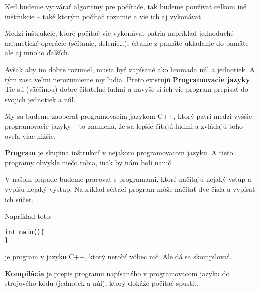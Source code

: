 \medskip

Keď budeme vytvárať algoritmy pre počítače, tak budeme používať celkom iné
inštrukcie -- také ktorým počítač rozumie a vie ich aj vykonávať.

Medzi inštrukcie, ktoré počítač vie vykonávať patria napríklad jednoduché
aritmetické operácie (sčítanie, delenie\dots), čítanie z pamäte ukladanie do
pamäte ale aj mnoho ďalších. 

Avšak aby im dobre rozumel, musia byť zapísané ako hromada núl a jednotiek. A
tým zasa veľmi nerozumieme my ľudia.  Preto existujú \textbf{Programovacie
jazyky}. Tie sú (väčšinou) dobre čitateľné ľudmi a navyše si ich vie program
prepísať do svojich jednotiek a núl.

My sa budeme zaoberať programovacím jazykom C++, ktorý patrí medzi vyššie
programovacie jazyky -- to znamená, že sa lepšie čítajú ľuďmi a zvládajú toho
oveľa viac nižšie.

\medskip

\textbf{Program} je skupina inštrukcií v nejakom programovacom jazyku.  A tieto
programy obvykle niečo robia, inak by nám boli nanič. 

V našom prípade budeme pracovať s programami, ktoré načítajú nejaký vstup a
vypíšu nejaký výstup.  Napríklad sčítací program môže načítať dve čísla a
vypísať ich súčet.

Napríklad toto:
\begin{lstlisting}
int main(){
}
\end{lstlisting}
je program v jazyku C++, ktorý nerobí vôbec nič. Ale dá sa skompilovať. 


\textbf{Kompilácia} je prepis programu napísaného v programovacom jazyku do
strojového kódu (jednotek a núl), ktorý dokáže počítač spustiť.

